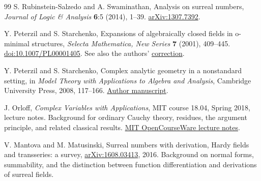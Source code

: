 \documentclass[11pt,oneside]{article}
\numberwithin{equation}{section}
\theoremstyle{definition}
\theoremstyle{remark}\newtheorem{remark}[theorem]{Remark}
\begin{document}
\begin{thebibliography}{99}
S. Rubinstein-Salzedo and A. Swaminathan, Analysis on surreal numbers,
\emph{Journal of Logic \& Analysis} \textbf{6}:5 (2014), 1--39.
\href{https://arxiv.org/abs/1307.7392}{arXiv:1307.7392}.

Y. Peterzil and S. Starchenko, Expansions of algebraically closed fields
in o-minimal structures, \emph{Selecta Mathematica, New Series}
\textbf{7} (2001), 409--445.
\href{https://doi.org/10.1007/PL00001405}{doi:10.1007/PL00001405}.
See also the authors'
\href{https://math.haifa.ac.il/kobi/Correction.pdf}{correction}.

Y. Peterzil and S. Starchenko, Complex analytic geometry in a nonstandard
setting, in \emph{Model Theory with Applications to Algebra and Analysis},
Cambridge University Press, 2008, 117--166.
\href{https://math.haifa.ac.il/kobi/Newton.pdf}{Author manuscript}.

J. Orloff, \emph{Complex Variables with Applications}, MIT course 18.04,
Spring 2018, lecture notes. Background for ordinary Cauchy theory,
residues, the argument principle, and related classical results.
\href{https://ocw.mit.edu/courses/18-04-complex-variables-with-applications-spring-2018/pages/lecture-notes/}{MIT OpenCourseWare lecture notes}.

V. Mantova and M. Matusinski, Surreal numbers with derivation,
Hardy fields and transseries: a survey,
\href{https://arxiv.org/abs/1608.03413}{arXiv:1608.03413}, 2016.
Background on normal forms, summability, and the distinction between
function differentiation and derivations of surreal fields.
\end{thebibliography}
\end{document}
